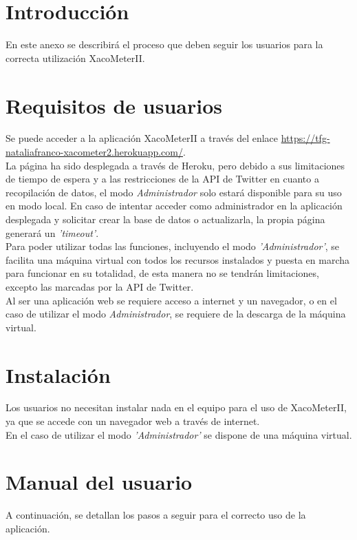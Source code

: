 
\section{Introducción}
En este anexo se describirá el proceso que deben seguir los usuarios para la correcta utilización XacoMeterII.
\section{Requisitos de usuarios}
Se puede acceder a la aplicación XacoMeterII a través del enlace \url{https://tfg-nataliafranco-xacometer2.herokuapp.com/}.\\
La página ha sido desplegada a través de Heroku, pero debido a sus limitaciones de tiempo de espera y a las restricciones de la API de Twitter en cuanto a recopilación de datos, el modo \textit{Administrador} solo estará disponible para su uso en modo local. En caso de intentar acceder como administrador en la aplicación desplegada y solicitar crear la base de datos o actualizarla, la propia página generará un \textit{'timeout'}.\\
Para poder utilizar todas las funciones, incluyendo el modo \textit{'Administrador'}, se facilita una máquina virtual con todos los recursos instalados y puesta en marcha para funcionar en su totalidad, de esta manera no se tendrán limitaciones, excepto las marcadas por la API de Twitter.\\
Al ser una aplicación web se requiere acceso a internet y un navegador, o en el caso de utilizar el modo \textit{Administrador}, se requiere de la descarga de la máquina virtual.
\section{Instalación}
Los usuarios no necesitan instalar nada en el equipo para el uso de XacoMeterII, ya que se accede con un navegador web a través de internet.\\
En el caso de utilizar el modo \textit{'Administrador'} se dispone de una máquina virtual.

\section{Manual del usuario}
A continuación, se detallan los pasos a seguir para el correcto uso de la aplicación.
